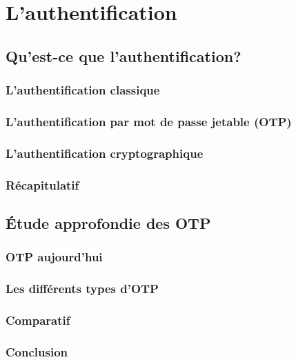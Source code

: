 \chapter{L'authentification}


\section{Qu'est-ce que l'authentification?}

\subsection{L'authentification classique}

\subsection{L'authentification par mot de passe jetable (OTP)}

\subsection{L'authentification cryptographique}

\subsection{Récapitulatif}


\section{Étude approfondie des OTP}

\subsection{OTP aujourd'hui}

\subsection{Les différents types d'OTP}

\subsection{Comparatif}

\subsection{Conclusion}